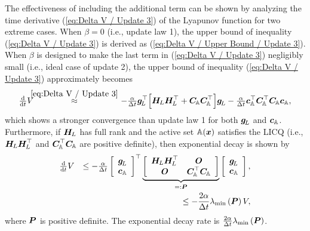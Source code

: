 \documentclass[journal]{IEEEtranTIE}
\begin{document}
The effectiveness of including the additional term can be shown by analyzing the time derivative (\ref{eq:Delta V / Update 3}) of the Lyapunov function for two extreme cases. When $\beta = 0$ (i.e., update law 1), the upper bound of inequality (\ref{eq:Delta V / Update 3}) is derived as (\ref{eq:Delta V / Upper Bound / Update 3}). When $\beta$ is designed to make the last term in (\ref{eq:Delta V / Update 3}) negligibly small (i.e., ideal case of update 2), the upper bound of inequality (\ref{eq:Delta V / Update 3}) approximately becomes
\begin{eqnarray}
\ddtsmall V & \!\!\!\! \stackrel{\eqref{eq:Delta V / Update 3}}{\approx} \!\!\!\!  & -\tfrac{\alpha}{\Delta t} \mv{g}_{\!L}^\top \Big[ \mm{H}_{\! L} \mm{H}_{\! L}^\top + \mm{C}_{\!\mathbb{A}} \mm{C}_{\!\mathbb{A}}^\top \Big] \mv{g}_{\!L} -\tfrac{\alpha}{\Delta t}  \mv{c}_{\mathbb{A}}^\top \mm{C}_{\!\mathbb{A}}^\top  \mm{C}_{\!\mathbb{A}} \mv{c}_{\mathbb{A}}, \notag
\end{eqnarray}
which shows a stronger convergence than update law 1 for both $\boldsymbol{g}_{\!L}$ and $\boldsymbol{c}_{\mathbb{A}}$. Furthermore, if $\boldsymbol{H}_{\! L}$ has full rank and the active set $\mathbb{A}(\boldsymbol{x})$ satisfies the LICQ (i.e., $\boldsymbol{H}_{\! L} \boldsymbol{H}_{\! L}^\top$ and $\boldsymbol{C}_{\!\mathbb{A}}^\top \boldsymbol{C}_{\!\mathbb{A}}$ are positive definite), then exponential decay is shown by
\begin{eqnarray}
\ddtsmall V & & \le -\tfrac{\alpha}{\Delta t}\left[ {\begin{array}{*{20}{c}}
{\mv{g}_{\!L}}\\
{\mv{c}_{\mathbb{A}}}
\end{array}} \right]^\top \underbrace{\left[ {\begin{array}{*{20}{c}}
\mm{H}_{\! L} \mm{H}_{\! L}^\top&\mm{O}\\
\mm{O}&\mm{C}_{\!\mathbb{A}}^\top  \mm{C}_{\!\mathbb{A}} 
\end{array}} \right]}_{=:\mm{P}} \left[ {\begin{array}{*{20}{c}}
{\mv{g}_{\!L}}\\
{\mv{c}_{\mathbb{A}}}
\end{array}} \right], \notag\\
& & \le - \frac{{2\alpha }}{{\Delta t}}{\lambda _{\min }}\left( \mm{P} \right)V, \notag
\end{eqnarray}
where $\boldsymbol{P}$ is positive definite. The exponential decay rate is $\frac{{2\alpha }}{{\Delta t}}{\lambda _{\min }}\left( \boldsymbol{P} \right)$.
\end{document}
